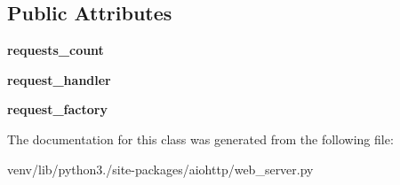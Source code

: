 \subsection*{Public Attributes}
\begin{DoxyCompactItemize}
\item 
\mbox{\label{classaiohttp_1_1web__server_1_1_server_af9eea844dbb46e226feabaf34a919d2e}} 
{\bfseries requests\+\_\+count}
\item 
\mbox{\label{classaiohttp_1_1web__server_1_1_server_adff31f79f53e56076a8998260ad5ba42}} 
{\bfseries request\+\_\+handler}
\item 
\mbox{\label{classaiohttp_1_1web__server_1_1_server_a7670b97bf0251159a5449512c4d48aba}} 
{\bfseries request\+\_\+factory}
\end{DoxyCompactItemize}


The documentation for this class was generated from the following file\+:\begin{DoxyCompactItemize}
\item 
venv/lib/python3./site-\/packages/aiohttp/web\+\_\+server.\+py\end{DoxyCompactItemize}
